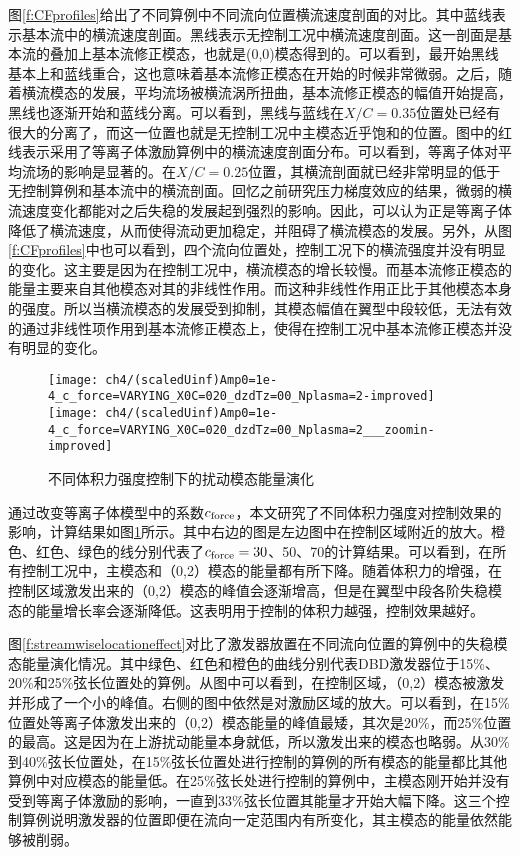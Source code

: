 图\ref{f:CFprofiles}给出了不同算例中不同流向位置横流速度剖面的对比。其中蓝线表示基本流中的横流速度剖面。黑线表示无控制工况中横流速度剖面。这一剖面是基本流的叠加上基本流修正模态，也就是(0,0)模态得到的。可以看到，最开始黑线基本上和蓝线重合，这也意味着基本流修正模态在开始的时候非常微弱。之后，随着横流模态的发展，平均流场被横流涡所扭曲，基本流修正模态的幅值开始提高，黑线也逐渐开始和蓝线分离。可以看到，黑线与蓝线在$X/C=0.35$位置处已经有很大的分离了，而这一位置也就是无控制工况中主模态近乎饱和的位置。图中的红线表示采用了等离子体激励算例中的横流速度剖面分布。可以看到，等离子体对平均流场的影响是显著的。在$X/C=0.25$位置，其横流剖面就已经非常明显的低于无控制算例和基本流中的横流剖面。回忆之前研究压力梯度效应的结果，微弱的横流速度变化都能对之后失稳的发展起到强烈的影响。因此，可以认为正是等离子体降低了横流速度，从而使得流动更加稳定，并阻碍了横流模态的发展。另外，从图\ref{f:CFprofiles}中也可以看到，四个流向位置处，控制工况下的横流强度并没有明显的变化。这主要是因为在控制工况中，横流模态的增长较慢。而基本流修正模态的能量主要来自其他模态对其的非线性作用。而这种非线性作用正比于其他模态本身的强度。所以当横流模态的发展受到抑制，其模态幅值在翼型中段较低，无法有效的通过非线性项作用到基本流修正模态上，使得在控制工况中基本流修正模态并没有明显的变化。
\begin{figure}
\centering
\texttt{[image: ch4/(scaledUinf)Amp0=1e-4\_c\_force=VARYING\_X0C=020\_dzdTz=00\_Nplasma=2-improved]}
\texttt{[image: ch4/(scaledUinf)Amp0=1e-4\_c\_force=VARYING\_X0C=020\_dzdTz=00\_Nplasma=2\_\_\_zoomin-improved]}
\caption{不同体积力强度控制下的扰动模态能量演化}%
\label{f:forcestrength}
\end{figure}

通过改变等离子体模型中的系数$c_{\rm force}$，本文研究了不同体积力强度对控制效果的影响，计算结果如图\ref{f:forcestrength}所示。其中右边的图是左边图中在控制区域附近的放大。橙色、红色、绿色的线分别代表了$c_{\rm force}=30$、50、70的计算结果。可以看到，在所有控制工况中，主模态和（0,2）模态的能量都有所下降。随着体积力的增强，在控制区域激发出来的（0,2）模态的峰值会逐渐增高，但是在翼型中段各阶失稳模态的能量增长率会逐渐降低。这表明用于控制的体积力越强，控制效果越好。

图\ref{f:streamwiselocationeffect}对比了激发器放置在不同流向位置的算例中的失稳模态能量演化情况。其中绿色、红色和橙色的曲线分别代表DBD激发器位于15\%、20\%和25\%弦长位置处的算例。从图中可以看到，在控制区域，（0,2）模态被激发并形成了一个小的峰值。右侧的图中依然是对激励区域的放大。可以看到，在15\%位置处等离子体激发出来的（0,2）模态能量的峰值最矮，其次是20\%，而25\%位置的最高。这是因为在上游扰动能量本身就低，所以激发出来的模态也略弱。从30\%到40\%弦长位置处，在15\%弦长位置处进行控制的算例的所有模态的能量都比其他算例中对应模态的能量低。在25\%弦长处进行控制的算例中，主模态刚开始并没有受到等离子体激励的影响，一直到33\%弦长位置其能量才开始大幅下降。这三个控制算例说明激发器的位置即便在流向一定范围内有所变化，其主模态的能量依然能够被削弱。

